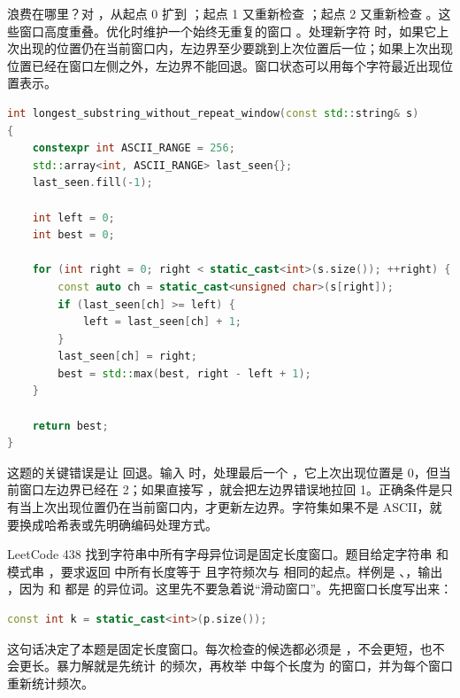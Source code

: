 浪费在哪里？对 ，从起点 0 扩到 ；起点 1 又重新检查 ；起点 2 又重新检查 。这些窗口高度重叠。优化时维护一个始终无重复的窗口 。处理新字符  时，如果它上次出现的位置仍在当前窗口内，左边界至少要跳到上次位置后一位；如果上次出现位置已经在窗口左侧之外，左边界不能回退。窗口状态可以用每个字符最近出现位置表示。

\begin{lstlisting}[language=C++,caption={LeetCode 3 无重复字符的最长子串}]
int longest_substring_without_repeat_window(const std::string& s)
{
    constexpr int ASCII_RANGE = 256;
    std::array<int, ASCII_RANGE> last_seen{};
    last_seen.fill(-1);

    int left = 0;
    int best = 0;

    for (int right = 0; right < static_cast<int>(s.size()); ++right) {
        const auto ch = static_cast<unsigned char>(s[right]);
        if (last_seen[ch] >= left) {
            left = last_seen[ch] + 1;
        }
        last_seen[ch] = right;
        best = std::max(best, right - left + 1);
    }

    return best;
}
\end{lstlisting}

这题的关键错误是让  回退。输入  时，处理最后一个 ，它上次出现位置是 0，但当前窗口左边界已经在 2；如果直接写 ，就会把左边界错误地拉回 1。正确条件是只有当上次出现位置仍在当前窗口内，才更新左边界。字符集如果不是 ASCII，就要换成哈希表或先明确编码处理方式。

LeetCode 438 找到字符串中所有字母异位词是固定长度窗口。题目给定字符串  和模式串 ，要求返回  中所有长度等于  且字符频次与  相同的起点。样例是 、，输出 \code{[0,6]}，因为  和  都是  的异位词。这里先不要急着说“滑动窗口”。先把窗口长度写出来：

\begin{lstlisting}[language=C++,caption={LeetCode 438：窗口长度来自模式串长度}]
const int k = static_cast<int>(p.size());
\end{lstlisting}

这句话决定了本题是固定长度窗口。每次检查的候选都必须是 ，不会更短，也不会更长。暴力解就是先统计  的频次，再枚举  中每个长度为  的窗口，并为每个窗口重新统计频次。


